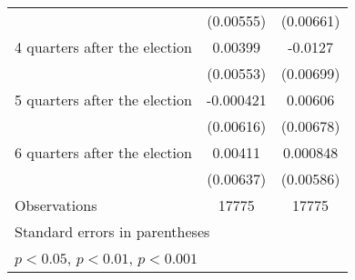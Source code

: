 \begin{table}[htbp]
\begin{tabular}{l*{2}{c}}
                    &   (0.00555)         &   (0.00661)         \\
[1em]
 4 quarters after the election&     0.00399         &     -0.0127         \\
                    &   (0.00553)         &   (0.00699)         \\
[1em]
 5 quarters after the election&   -0.000421         &     0.00606         \\
                    &   (0.00616)         &   (0.00678)         \\
[1em]
 6 quarters after the election&     0.00411         &    0.000848         \\
                    &   (0.00637)         &   (0.00586)         \\
\hline
Observations        &       17775         &       17775         \\
\hline\hline
\multicolumn{3}{l}{\footnotesize Standard errors in parentheses}\\
\multicolumn{3}{l}{\footnotesize \sym{*} \(p<0.05\), \sym{**} \(p<0.01\), \sym{***} \(p<0.001\)}\\
\end{tabular}
\end{table}

